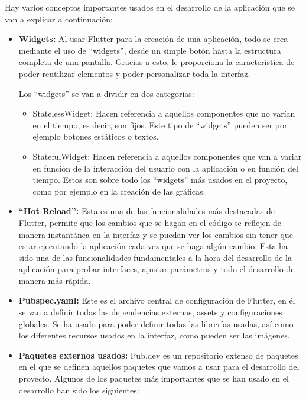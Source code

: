 Hay varios conceptos importantes usados en el desarrollo de la aplicación que se van a explicar a continuación:
\begin{itemize}
    \item \textbf{Widgets:} Al usar Flutter para la creación de una aplicación, todo se crea mediante el uso de ``widgets'', desde un simple botón hasta la estructura completa de una pantalla. Gracias a esto, le proporciona la característica de poder reutilizar elementos y poder personalizar toda la interfaz.

    Los ``widgets'' se van a dividir en dos categorías:
    \begin{itemize}
        \item {StatelessWidget:} Hacen referencia a aquellos componentes que no varían en el tiempo, es decir, son fijos. Este tipo de ``widgets'' pueden ser por ejemplo botones estáticos o textos.
        \item {StatefulWidget:} Hacen referencia a aquellos componentes que van a variar en función de la interacción del usuario con la aplicación o en función del tiempo. Estos son sobre todo los ``widgets'' más usados en el proyecto, como por ejemplo en la creación de las gráficas.
    \end{itemize}

    \item \textbf{``Hot Reload'':} Esta es una de las funcionalidades más destacadas de Flutter, permite que los cambios que se hagan en el código se reflejen de manera instantánea en la interfaz y se puedan ver los cambios sin tener que estar ejecutando la aplicación cada vez que se haga algún cambio. Esta ha sido una de las funcionalidades fundamentales a la hora del desarrollo de la aplicación para probar interfaces, ajustar parámetros y todo el desarrollo de manera más rápida.

    \item \textbf{Pubspec.yaml:} Este es el archivo central de configuración de Flutter, en él se van a definir todas las dependencias externas, assets y configuraciones globales. Se ha usado para poder definir todas las librerías usadas, así como los diferentes recursos usados en la interfaz, como pueden ser las imágenes.

    \item \textbf{Paquetes externos usados:} Pub.dev es un repositorio extenso de paquetes en el que se definen aquellos paquetes que vamos a usar para el desarrollo del proyecto. Algunos de los paquetes más importantes que se han usado en el desarrollo han sido los siguientes:


\end{itemize}
